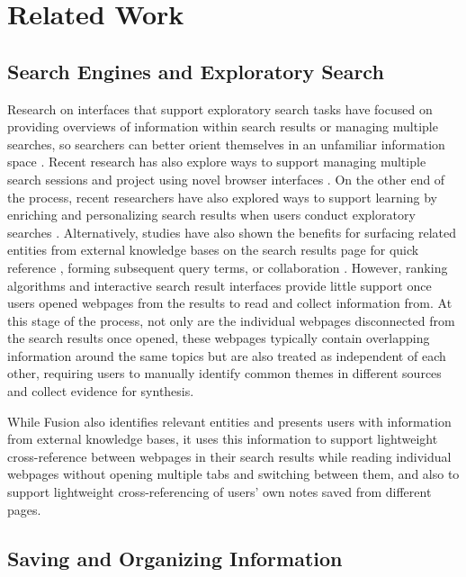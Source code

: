 \section{Related Work}

\subsection{Search Engines and Exploratory Search}

Research on interfaces that support exploratory search tasks have focused on providing overviews of information within search results or managing multiple searches, so searchers can better orient themselves in an unfamiliar information space \cite{hearst2009search,marchionini2000agileviews,patterson2001predicting,tretter2013searchpanel,morris2008searchbar}. Recent research has also explore ways to support managing multiple search sessions and project using novel browser interfaces \cite{hahn2018bento}. On the other end of the process, recent researchers have also explored ways to support learning by enriching and personalizing  search results when users conduct exploratory searches \cite{syed2017optimizing}. Alternatively, studies have also shown the benefits for surfacing related entities from external knowledge bases on the search results page for quick reference \cite{bota,miliaraki2015selena}, forming subsequent query terms\cite{klouche2015designing}, or collaboration \cite{andolina2018querytogether,klouche2018hyperlinks}. However, ranking algorithms and interactive search result interfaces provide little support once users opened webpages from the results to read and collect information from. At this stage of the process, not only are the individual webpages disconnected from the search results once opened, these webpages typically contain overlapping information around the same topics but are also treated as independent of each other, requiring users to manually identify common themes in different sources and collect evidence for synthesis.

While Fusion also identifies relevant entities and presents users with information from external knowledge bases, it uses this information to support lightweight cross-reference between webpages  in their search results while reading individual webpages without opening multiple tabs and switching between them, and also to support lightweight cross-referencing of users' own notes saved from different pages.

\subsection{Saving and Organizing Information}

